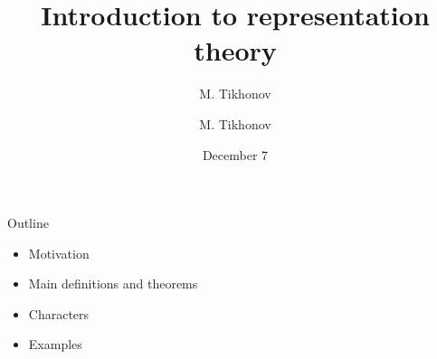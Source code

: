 \documentclass{beamer}
\author{M. Tikhonov}
\title{Introduction to representation theory}
\author{M. Tikhonov}
\institute{University of Virginia}
\date{December 7}
\begin{document}
\frame{\titlepage}

\begin{frame}{Outline}
    \begin{itemize}
        \item Motivation 
        \item Main definitions and theorems
        \item Characters
        \item Examples
    \end{itemize}
\end{frame}
\end{document}
